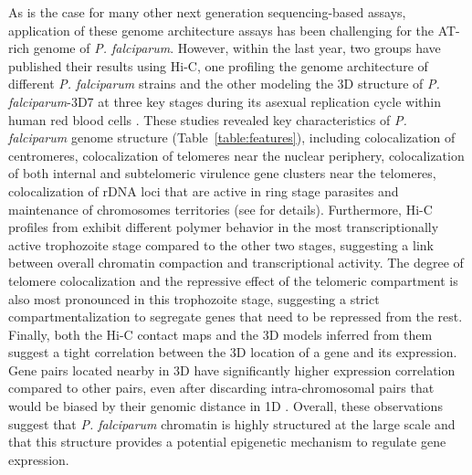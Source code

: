 As is the case for many other next generation sequencing-based assays,
application of these genome architecture assays has been challenging for the
AT-rich genome of \textit{P. falciparum}. However, within the last year, two groups
have published their results using Hi-C, one profiling the genome architecture
of different \textit{P. falciparum} strains \citep{lemieux:genome-wide} 
and the other modeling the 3D
structure of \textit{P. falciparum}-3D7 at three key stages during its asexual
replication cycle within human red blood cells \citep{ay:three-dimensional}.
These studies revealed
key characteristics of \textit{P. falciparum} genome structure (Table~\ref{table:features}), including
colocalization of centromeres, colocalization of telomeres near the nuclear
periphery, colocalization of both internal and subtelomeric virulence gene
clusters near the telomeres, colocalization of rDNA loci that are active in
ring stage parasites and maintenance of chromosomes territories (see
\citet{ay:three-dimensional} for details). Furthermore, Hi-C profiles from
\citet{ay:three-dimensional} exhibit different
polymer behavior in the most transcriptionally active trophozoite stage
compared to the other two stages, suggesting a link between overall chromatin
compaction and transcriptional activity. The degree of telomere colocalization
and the repressive effect of the telomeric compartment is also most pronounced
in this trophozoite stage, suggesting a strict compartmentalization to
segregate genes that need to be repressed from the rest. Finally, both the
Hi-C contact maps and the 3D models inferred from them suggest a tight
correlation between the 3D location of a gene and its expression. Gene pairs
located nearby in 3D have significantly higher expression correlation compared
to other pairs, even after discarding intra-chromosomal pairs that would be
biased by their genomic distance in 1D \citep{ay:three-dimensional}. Overall, these observations
suggest that \textit{P. falciparum} chromatin is highly structured at the large scale
and that this structure provides a potential epigenetic mechanism to regulate
gene expression.

